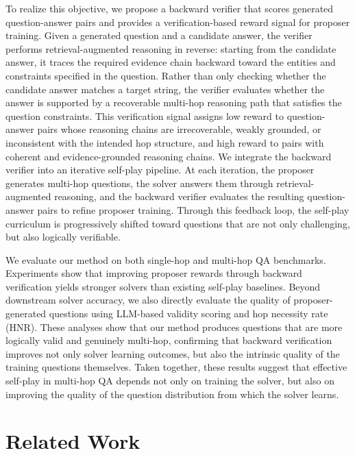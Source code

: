 \documentclass{article}
\begin{document}
To realize this objective, we propose a backward verifier that scores generated question-answer pairs and provides a verification-based reward signal for proposer training. Given a generated question and a candidate answer, the verifier performs retrieval-augmented reasoning in reverse: starting from the candidate answer, it traces the required evidence chain backward toward the entities and constraints specified in the question. Rather than only checking whether the candidate answer matches a target string, the verifier evaluates whether the answer is supported by a recoverable multi-hop reasoning path that satisfies the question constraints. This verification signal assigns low reward to question-answer pairs whose reasoning chains are irrecoverable, weakly grounded, or inconsistent with the intended hop structure, and high reward to pairs with coherent and evidence-grounded reasoning chains.
We integrate the backward verifier into an iterative self-play pipeline. At each iteration, the proposer generates multi-hop questions, the solver answers them through retrieval-augmented reasoning, and the backward verifier evaluates the resulting question-answer pairs to refine proposer training. Through this feedback loop, the self-play curriculum is progressively shifted toward questions that are not only challenging, but also logically verifiable.

We evaluate our method on both single-hop and multi-hop QA benchmarks. Experiments show that improving proposer rewards through backward verification yields stronger solvers than existing self-play baselines. Beyond downstream solver accuracy, we also directly evaluate the quality of proposer-generated questions using LLM-based validity scoring and hop necessity rate (HNR). These analyses show that our method produces questions that are more logically valid and genuinely multi-hop, confirming that backward verification improves not only solver learning outcomes, but also the intrinsic quality of the training questions themselves. Taken together, these results suggest that effective self-play in multi-hop QA depends not only on training the solver, but also on improving the quality of the question distribution from which the solver learns.




\section{Related Work}
\end{document}
